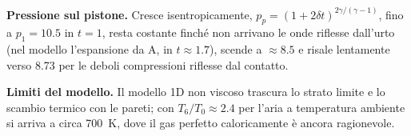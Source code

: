 \documentclass[11pt,a4paper]{article}
\begin{document}
\textbf{Pressione sul pistone.} Cresce isentropicamente, $p_p=(1+2\delta t)^{2\gamma/(\gamma-1)}$, fino a
$p_1=\num{10.5}$ in $t=1$, resta costante finché non arrivano le onde riflesse dall'urto (nel modello
l'espansione da A, in $t\approx\num{1.7}$), scende a $\approx\num{8.5}$ e risale lentamente verso \num{8.73} per le
deboli compressioni riflesse dal contatto.

\textbf{Limiti del modello.} Il modello 1D non viscoso trascura lo strato limite e lo scambio termico con le pareti;
con $T_6/T_0\approx\num{2.4}$ per l'aria a temperatura ambiente si arriva a circa \SI{700}{K}, dove il gas perfetto
caloricamente è ancora ragionevole.
\end{document}
